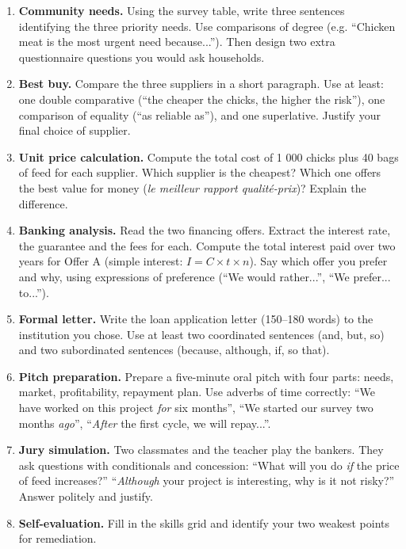 \documentclass[11pt]{article}
\newcounter{popsec}
\newcounter{popsub}
\newcommand{\courssub}[1]{%
  \stepcounter{popsub}%
  \par\vspace{9pt}\noindent{\popxbold\fontsize{11.5}{13}\selectfont\color{popink}{\color{poporange}\thepopsec.\thepopsub}\hspace{6pt}#1}\par\nopagebreak\vspace{4pt}
}
\begin{document}
\begin{enumerate}
\item \textbf{Community needs.} Using the survey table, write three sentences identifying the three priority needs. Use comparisons of degree (e.g. ``Chicken meat is the most urgent need because...''). Then design two extra questionnaire questions you would ask households.
\item \textbf{Best buy.} Compare the three suppliers in a short paragraph. Use at least: one double comparative (``the cheaper the chicks, the higher the risk''), one comparison of equality (``as reliable as''), and one superlative. Justify your final choice of supplier.
\item \textbf{Unit price calculation.} Compute the total cost of 1 000 chicks plus 40 bags of feed for each supplier. Which supplier is the cheapest? Which one offers the best value for money (\emph{le meilleur rapport qualité-prix})? Explain the difference.
\item \textbf{Banking analysis.} Read the two financing offers. Extract the interest rate, the guarantee and the fees for each. Compute the total interest paid over two years for Offer A (simple interest: $I = C \times t \times n$). Say which offer you prefer and why, using expressions of preference (``We would rather...'', ``We prefer... to...'').
\item \textbf{Formal letter.} Write the loan application letter (150--180 words) to the institution you chose. Use at least two coordinated sentences (and, but, so) and two subordinated sentences (because, although, if, so that).
\item \textbf{Pitch preparation.} Prepare a five-minute oral pitch with four parts: needs, market, profitability, repayment plan. Use adverbs of time correctly: ``We have worked on this project \emph{for} six months'', ``We started our survey two months \emph{ago}'', ``\emph{After} the first cycle, we will repay...''.
\item \textbf{Jury simulation.} Two classmates and the teacher play the bankers. They ask questions with conditionals and concession: ``What will you do \emph{if} the price of feed increases?'' ``\emph{Although} your project is interesting, why is it not risky?'' Answer politely and justify.
\item \textbf{Self-evaluation.} Fill in the skills grid and identify your two weakest points for remediation.
\end{enumerate}

\courssub{Ressources à mobiliser}
\end{document}
